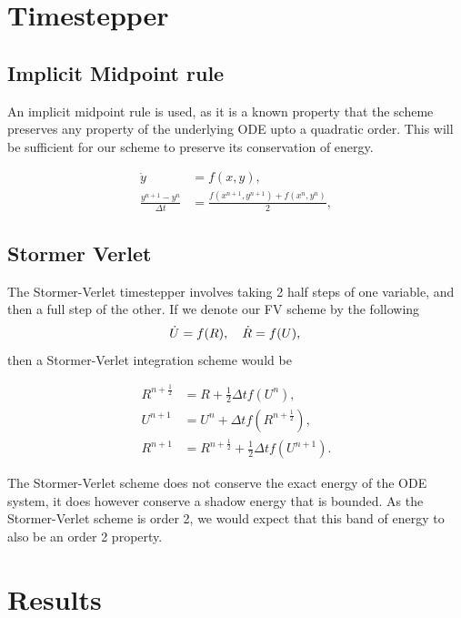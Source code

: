 \documentclass[a4paper,11pt]{article}
\begin{document}
\section{Timestepper}
\subsection{Implicit Midpoint rule}
An implicit midpoint rule is used, as it is a known property that the scheme preserves any property of the underlying ODE upto a quadratic order. This will be sufficient for our scheme to preserve its conservation of energy.

\begin{equation} \begin{aligned} \dot {y} &= f(x,y),\\
\frac{y^{n+1}- y^n}{\Delta t} &= \frac{ f(x^{n+1}, y^{n+1}) + f(x^n, y^n)}{2}, \end{aligned}\end{equation}
\subsection{Stormer Verlet}

The Stormer-Verlet timestepper involves taking 2 half steps of one variable, and then a full step of the other. If we denote our FV scheme by the following
\begin{equation}  \dot {U} = f(R), \quad \dot {R} = f(U), \\\end{equation}
then a Stormer-Verlet integration scheme would be 


\begin{equation} \begin{aligned} R^{n+\frac{1}{2}} &= R + \frac{1}{2}\Delta t f(U^n),\\
U^{n+1} &= U^{n} + \Delta t f(R^{n+\frac{1}{2}}), \\
R^{n+1} &= R^{n+\frac{1}{2} } + \frac{1}{2} \Delta t f(U^{n+1}).\end{aligned}\end{equation}

The Stormer-Verlet scheme does not conserve the exact energy of the ODE system, it does however conserve a shadow energy that is bounded. As the Stormer-Verlet scheme is order 2, we would expect that this band of energy to also be an order 2 property. 

\section{Results}
\end{document}
